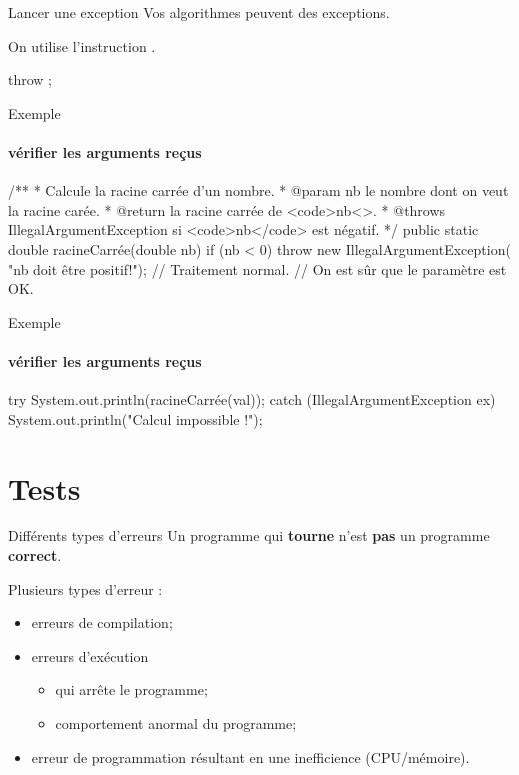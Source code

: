 \begin{hideedit}
\begin{frame}[fragile]{Lancer une exception}
  Vos algorithmes peuvent  des exceptions.

  \pause
  On utilise l'instruction .

  \pause
  \begin{grammaire}
    throw ;
  \end{grammaire}
\end{frame}

\begin{frame}[fragile]{Exemple}
  \framesubtitle{vérifier les arguments reçus}

\begin{java}
/**
 * Calcule la racine carrée d'un nombre.
 * @param nb le nombre dont on veut la racine carée.
 * @return la racine carrée de <code>nb<\code>.
 * @throws IllegalArgumentException si <code>nb</code> est négatif.
 */
public static double racineCarrée(double nb) {
    if (nb < 0) {
        throw new IllegalArgumentException(
            "nb doit être positif!");
    }
    // Traitement normal.
    // On est sûr que le paramètre est OK.
}
\end{java}
\end{frame}

\begin{frame}[fragile]{Exemple}
  \framesubtitle{vérifier les arguments reçus}
\begin{java}
try {
    System.out.println(racineCarrée(val));
} catch (IllegalArgumentException ex) {
    System.out.println("Calcul impossible !");
}
\end{java}
\end{frame}

\section{Tests}
\frame{\sectionpage}

\begin{frame}{Différents types d'erreurs}
  Un programme qui \textbf{tourne} n'est \textbf{pas} un programme
  \textbf{correct}.

  \pause
  Plusieurs types d'erreur :
  \begin{itemize}[<+->]
    \item erreurs de compilation;
    \item erreurs d'exécution
      \begin{itemize}
        \item qui arrête le programme;
        \item comportement anormal du programme;
      \end{itemize}
    \item erreur de programmation résultant en une inefficience (CPU/mémoire).
  \end{itemize}
\end{frame}


\end{hideedit}

